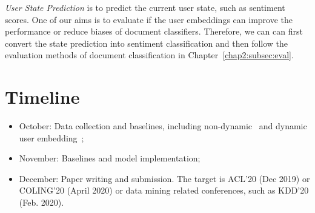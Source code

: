 \textit{User State Prediction} is to predict the current user state, such as sentiment scores. One of our aims is to evaluate if the user embeddings can improve the performance or reduce biases of document classifiers. Therefore, we can can first convert the state prediction into sentiment classification and then follow the evaluation methods of document classification in Chapter~\ref{chap2:subsec:eval}.


\section{Timeline}


\begin{itemize}
    \item October: Data collection and baselines, including non-dynamic~\cite{benton2016learning, amir2016modelling} and dynamic user embedding~\cite{liang2018dynamic, kumar2019predicting};
    \item November: Baselines and model implementation;
    \item December: Paper writing and submission. The target is ACL'20 (Dec 2019) or COLING'20 (April 2020) or data mining related conferences, such as KDD'20 (Feb. 2020).
\end{itemize}
